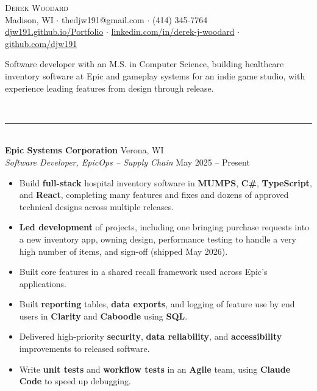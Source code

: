 \documentclass[letterpaper, 11pt]{article}
\newcommand{\header}[1]{%
  \vspace{5pt}{\large\scshape #1}\\[-7pt]\rule{\linewidth}{0.4pt}\\[1pt]}
\newcommand{\role}[4]{%
  \textbf{#1} \hfill #2\\ \textit{#3} \hfill #4\\[-1pt]}
\begin{document}
\begin{center}
  {\Huge \scshape Derek Woodard}\\[4pt]
  Madison, WI $\cdot$ thedjw191@gmail.com $\cdot$ (414) 345-7764\\
  \href{https://djw191.github.io/Portfolio/}{djw191.github.io/Portfolio} $\cdot$
  \href{https://www.linkedin.com/in/derek-j-woodard/}{linkedin.com/in/derek-j-woodard} $\cdot$
  \href{https://github.com/djw191}{github.com/djw191}
\end{center}
\vspace{-4pt}

Software developer with an M.S. in Computer Science, building healthcare inventory software at Epic and gameplay systems for an indie game studio, with experience leading features from design through release.

\header{Work Experience}

\role{Epic Systems Corporation}{Verona, WI}{Software Developer, EpicOps -- Supply Chain}{May 2025 -- Present}
\begin{itemize}
  \item Build \textbf{full-stack} hospital inventory software in \textbf{MUMPS}, \textbf{C\#}, \textbf{TypeScript}, and \textbf{React}, completing many features and fixes and dozens of approved technical designs across multiple releases.
  \item \textbf{Led development} of projects, including one bringing purchase requests into a new inventory app, owning design, performance testing to handle a very high number of items, and sign-off (shipped May 2026).
  \item Built core features in a shared recall framework used across Epic's applications.
  \item Built \textbf{reporting} tables, \textbf{data exports}, and logging of feature use by end users in \textbf{Clarity} and \textbf{Caboodle} using \textbf{SQL}.
  \item Delivered high-priority \textbf{security}, \textbf{data reliability}, and \textbf{accessibility} improvements to released software.
  \item Write \textbf{unit tests} and \textbf{workflow tests} in an \textbf{Agile} team, using \textbf{Claude Code} to speed up debugging.
\end{itemize}
\vspace{4pt}
\end{document}
